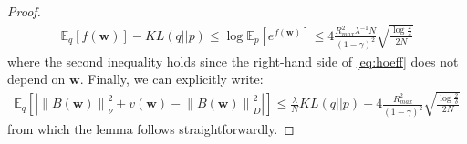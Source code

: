 \documentclass{article}
\newcommand{\norm}[1]{\left\lVert #1 \right\rVert}
\newcommand{\abs}[1]{\left\lvert #1 \right\rvert}
\begin{document}
\begin{proof}
\begin{align*}
\mathbb{E}_q\left[ f(\bm{w}) \right] - KL(q||p) \leq \log\mathbb{E}_p\left[e^{f(\bm{w})}\right] \leq 4\frac{R_{max}^2 \lambda^{-1}N}{(1-\gamma)^2}\sqrt{\frac{\log\frac{2}{\delta}}{2N}}
\end{align*}
where the second inequality holds since the right-hand side of \eqref{eq:hoeff} does not depend on $\bm{w}$. Finally, we can explicitly write:
\begin{align*}
\mathbb{E}_q\left[ \abs{\norm{B(\bm{w})}_{\nu}^2 + v(\bm{w}) - \norm{B(\bm{w})}_D^2} \right] \leq \frac{\lambda}{N} KL(q||p) + 4\frac{R_{max}^2}{(1-\gamma)^2}\sqrt{\frac{\log\frac{2}{\delta}}{2N}}
\end{align*}
from which the lemma follows straightforwardly.
\end{proof}
\end{document}
